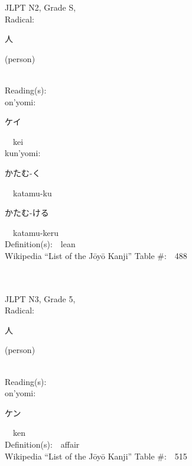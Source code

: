 \begin{multicols}{2}
{JLPT N2, Grade S, \\Radical:\ \ {\begin{CJK}{UTF8}{min} 人 \end{CJK}} (person) } \\
Reading(s):\ \ \\
{\hspace*{1em}}on'yomi:\ \ \\
{\hspace*{2em}}{\begin{CJK}{UTF8}{min} ケイ \end{CJK}}\ \ kei\ \ \\
{\hspace*{1em}}kun'yomi:\ \ \\
{\hspace*{2em}}{\begin{CJK}{UTF8}{min} かたむ-く \end{CJK}}\ \ katamu-ku\ \ \\
{\hspace*{2em}}{\begin{CJK}{UTF8}{min} かたむ-ける \end{CJK}}\ \ katamu-keru\ \ \\
Definition(s):\ \ lean \\
Wikipedia ``List of the J\=oy\=o Kanji'' Table \#:\ \ 488 \\
\ \ \\
{\fontsize{34pt}{40pt}  }\ \ \\  %
{JLPT N3, Grade 5, \\Radical:\ \ {\begin{CJK}{UTF8}{min} 人 \end{CJK}} (person) } \\
Reading(s):\ \ \\
{\hspace*{1em}}on'yomi:\ \ \\
{\hspace*{2em}}{\begin{CJK}{UTF8}{min} ケン \end{CJK}}\ \ ken\ \ \\
Definition(s):\ \ affair \\
Wikipedia ``List of the J\=oy\=o Kanji'' Table \#:\ \ 515 \\
\ \ \\
{\fontsize{34pt}{40pt}  }\ \ \\  %

\end{multicols}
